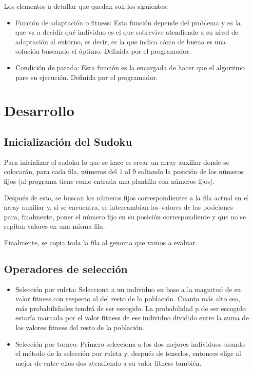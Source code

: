 \documentclass[a4,11pt]{article}
\begin{document}
 
Los elementos a detallar que quedan son los siguientes:

\begin{itemize}

\item Función de adaptación o fitness: Esta función depende del problema y es la que va a decidir qué individuo es el que sobrevive atendiendo a su nivel de adaptación al entorno, es decir, es la que indica cómo de buena es una solución buscando el óptimo. Definida por el programador.

\item Condición de parada: Esta función es la encargada de hacer que el algoritmo pare su ejecución. Definida por el programador.

\end{itemize}

\newpage

\section{Desarrollo}

\subsection{Inicialización del Sudoku}\label{des:init}

Para inicializar el sudoku lo que se hace es crear un array auxiliar donde se colocarán, para cada fila, números del 1 al 9 saltando la posición de los números fijos (al programa tiene como entrada una plantilla con números fijos).
 
Después de esto, se buscan los números fijos correspondientes a la fila actual en el array auxiliar y, si se encuentra, se intercambian los valores de las posiciones para, finalmente, poner el número fijo en su posición correspondiente y que no se repitan valores en una misma fila.
 
Finalmente, se copia toda la fila al genoma que vamos a evaluar.

\subsection{Operadores de selección}\label{des:ops}

\begin{itemize}
\item Selección por ruleta: Selecciona a un individuo en base a la magnitud de su valor fitness con respecto al del resto de la población. Cuanto más alto sea, más probabilidades tendrá de ser escogido. 
La probabilidad p de ser escogido estaría marcada por el valor fitness de ese individuo dividido entre la suma de los valores fitness del resto de la población.


\item Selección por torneo: Primero selecciona a los dos mejores individuos usando el método de la selección por ruleta y, después de tenerlos, entonces elige al mejor de entre ellos dos atendiendo a su valor fitness también.
\end{itemize}
\end{document}
